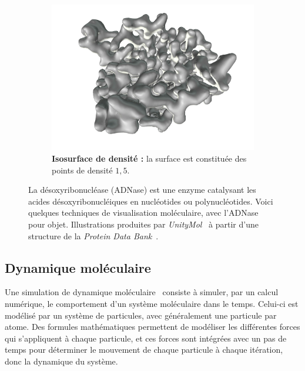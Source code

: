 \begin{figure}[htb]
\begin{subfigure}[t]{\subImgW}
		\end{subfigure}
		~
		\begin{subfigure}[t]{\subImgW}
			\centering
			\includegraphics[width=\textwidth]{./figures/ch1/4awn_iso_1_5}
			\caption[Isosurface de densité]{\textbf{Isosurface de densité :} la surface est constituée des points de densité $1,5$.}
			\label{fig:4awn_iso_1_5}
		\end{subfigure}
		\caption[Modes de représentation moléculaire]{La désoxyribonucléase (ADNase) est une enzyme catalysant les acides désoxyribonucléiques en nucléotides ou polynucléotides. Voici quelques techniques de visualisation moléculaire, avec l'ADNase pour objet. Illustrations produites par \emph{UnityMol}~\cite{doutreligne2014unitymol} à partir d'une structure de la \emph{Protein Data Bank}~\cite{parsiegla2012structure}.}
		\label{fig:4awn_atom}
	\end{figure}

	
	\subsection{Dynamique moléculaire}
	Une simulation de dynamique moléculaire~\cite{fermi1955alamos, alder1959studies, rahman1964correlations, gibson1960dynamics, lennard1924determination} consiste à simuler, par un calcul numérique, le comportement d'un système moléculaire dans le temps. Celui-ci est modélisé par un système de particules, avec généralement une particule par atome. Des formules mathématiques permettent de modéliser les différentes forces qui s'appliquent à chaque particule, et ces forces sont intégrées avec un pas de temps pour déterminer le mouvement de chaque particule à chaque itération, donc la dynamique du système.%
	
